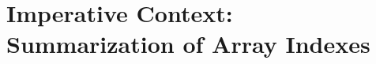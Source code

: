 \documentclass{beamer}
\renewcommand{\emph}[1]{\textcolor{structure}{#1}}
\newcommand{\emp}[1]{\textcolor{DikuRed}{ #1}}
\newcommand{\mymath}[1]{$ #1 $}
\begin{document}
%
%
%
%


\section{Imperative Context: Summarization of Array Indexes}
\begin{frame}[fragile]
	\tableofcontents[currentsection]
\end{frame}
\end{document}
